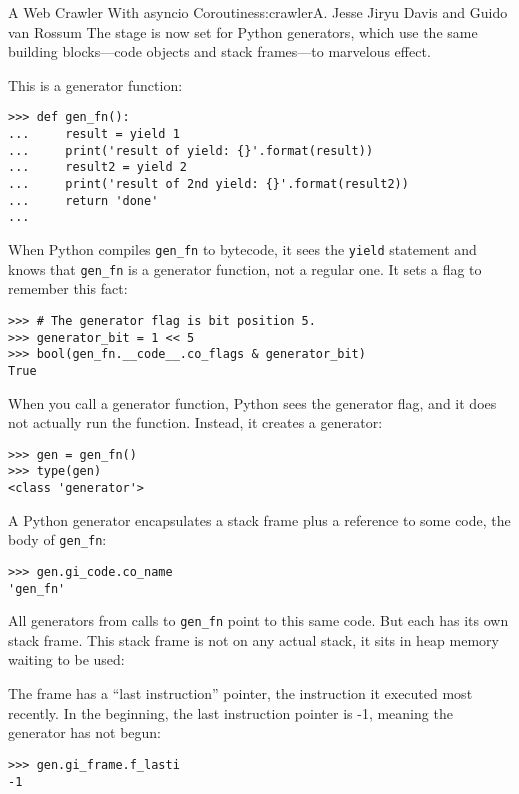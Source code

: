 \begin{aosachapter}{A Web Crawler With asyncio Coroutines}{s:crawler}{A. Jesse Jiryu Davis and Guido van Rossum}
The stage is now set for Python generators, which use the same building
blocks---code objects and stack frames---to marvelous effect.

This is a generator function:

\begin{verbatim}
>>> def gen_fn():
...     result = yield 1
...     print('result of yield: {}'.format(result))
...     result2 = yield 2
...     print('result of 2nd yield: {}'.format(result2))
...     return 'done'
...     
\end{verbatim}

When Python compiles \texttt{gen\_fn} to bytecode, it sees the
\texttt{yield} statement and knows that \texttt{gen\_fn} is a generator
function, not a regular one. It sets a flag to remember this fact:

\begin{verbatim}
>>> # The generator flag is bit position 5.
>>> generator_bit = 1 << 5
>>> bool(gen_fn.__code__.co_flags & generator_bit)
True
\end{verbatim}

When you call a generator function, Python sees the generator flag, and
it does not actually run the function. Instead, it creates a generator:

\begin{verbatim}
>>> gen = gen_fn()
>>> type(gen)
<class 'generator'>
\end{verbatim}

A Python generator encapsulates a stack frame plus a reference to some
code, the body of \texttt{gen\_fn}:

\begin{verbatim}
>>> gen.gi_code.co_name
'gen_fn'
\end{verbatim}

All generators from calls to \texttt{gen\_fn} point to this same code.
But each has its own stack frame. This stack frame is not on any actual
stack, it sits in heap memory waiting to be used:


The frame has a ``last instruction'' pointer, the instruction it
executed most recently. In the beginning, the last instruction pointer
is -1, meaning the generator has not begun:

\begin{verbatim}
>>> gen.gi_frame.f_lasti
-1
\end{verbatim}


\end{aosachapter}
